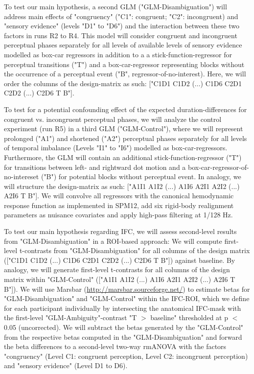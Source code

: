 \documentclass[12pt]{article}
\begin{document}
To test our main hypothesis, a second GLM ("GLM-Disambiguation") will address main effects of "congruency" ("C1": congruent; "C2": incongruent) and "sensory evidence" (levels "D1" to "D6") and the interaction between these two factors in runs R2 to R4. This model will consider congruent and incongruent perceptual phases separately for all levels of available levels of sensory evidence modelled as box-car regressors in addition to a a stick-function-regressor for perceptual transitions ("T") and a box-car-regressor representing blocks without the occurrence of a perceptual event ("B", regressor-of-no-interest). Here, we will order the columns of the design-matrix as such: ["C1D1 C1D2 (...) C1D6 C2D1 C2D2 (...) C2D6 T B"]. 

To test for a potential confounding effect of the expected duration-differences for congruent vs. incongruent perceptual phases, we will analyze the control experiment (run R5) in a third GLM ("GLM-Control"), where we will represent prolonged ("A1") and shortened ("A2") perceptual phases separately for all levels of temporal imbalance (Levels "I1" to "I6") modelled as box-car-regressors. Furthermore, the GLM will contain an additional stick-function-regressor ("T") for transitions between left- and rightward dot motion and a box-car-regressor-of-no-intereset ("B") for potential blocks without perceptual event. In analogy, we will structure the design-matrix as such: ["A1I1 A1I2 (...) A1I6 A2I1 A2I2 (...) A2I6 T B"]. 
We will convolve all regressors with the canonical hemodynamic response function as implemented in SPM12, add six rigid-body realignment parameters as nuisance covariates and apply high-pass filtering at 1/128 Hz. 

To test our main hypothesis regarding IFC, we will assess second-level results from "GLM-Disambiguation" in a ROI-based approach: We will compute first-level t-contrasts from "GLM-Disambiguation" for all columns of the design matrix (["C1D1 C1D2 (...) C1D6 C2D1 C2D2 (...) C2D6 T B"]) against baseline. By analogy, we will generate first-level t-contrasts for all columns of the design matrix within "GLM-Control" (["A1I1 A1I2 (...) A1I6 A2I1 A2I2 (...) A2I6 T B"]). We will use Marsbar (\url{http://marsbar.sourceforge.net/}) to estimate betas for "GLM-Disambiguation" and "GLM-Control" within the IFC-ROI, which we define for each participant individually by intersecting the anatomical IFC-mask with the first-level "GLM-Ambiguity"-contrast "T $>$ baseline" thresholded at p $<$ 0.05 (uncorrected). We will subtract the betas generated by the "GLM-Control" from the respective betas computed in the "GLM-Disambiguation" and forward the beta differences to a second-level two-way rmANOVA with the factors "congruency" (Level C1: congruent perception, Level C2: incongruent perception) and "sensory evidence" (Level D1 to D6).
\end{document}
